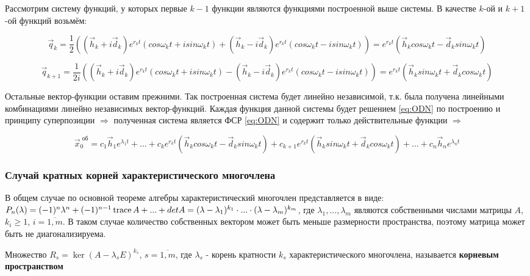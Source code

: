 Рассмотрим систему функций, у которых первые $k-1$ функции являются функциями построенной выше системы. В качестве $k$-ой и $k+1$-ой функций возьмём:

\[
   \vec{q}_k = \frac{1}{2}((\vec{h}_k + i \vec{d}_k) e^{r_k t} (cos \omega_k t + i sin \omega_k t) + (\vec{h}_k - i \vec{d}_k) e^{r_k t} (cos \omega_k t - i sin \omega_k t)) = e^{r_k t} (\vec{h}_k cos \omega_k t - \vec{d}_k sin \omega_k t)
\]

\[
   \vec{q}_{k+1} = \frac{1}{2i}((\vec{h}_k + i \vec{d}_k) e^{r_k t} (cos \omega_k t + i sin \omega_k t) - (\vec{h}_k - i \vec{d}_k) e^{r_k t} (cos \omega_k t - i sin \omega_k t)) = e^{r_k t} (\vec{h}_k sin \omega_k t + \vec{d}_k cos \omega_k t)
\]

Остальные вектор-функции оставим прежними. Так построенная система будет линейно независимой, т.к. была получена линейными комбинациями линейно независимых вектор-функций. Каждая функция данной системы будет решением \eqref{eq:ODN} по построению и принципу суперпозиции $\Rightarrow$ полученная система является ФСР \eqref{eq:ODN} и содержит только действительные функции $\Rightarrow$ 

\begin{equation*}
  \boxed{\vec{x}^{\text{ об}}_0 = c_1 \vec{h}_1 e^{\lambda_1 t} + ...+ c_k e^{r_k t} (\vec{h}_k cos \omega_k t - \vec{d}_k sin \omega_k t) + c_{k+1} e^{r_k t} (\vec{h}_k sin \omega_k t + \vec{d}_k cos \omega_k t) + ... + c_n \vec{h}_n e^{\lambda_n t}}
\end{equation*}

\subsubsection*{Случай кратных корней характеристического многочлена}

В общем случае по основной теореме алгебры характеристический многочлен представляется в виде: 
$P_n (\lambda) = (-1)^n \lambda^n + (-1)^{n-1}\operatorname{trace} A + ... + det A = (\lambda - \lambda_1)^{k_1} \cdot ... \cdot (\lambda - \lambda_m)^{k_m}$, 
где $\lambda_1, ..., \lambda_m$ являются собственными числами матрицы $A$, $k_i \geq 1$, $i = \overline{1, m}$. 
В таком случае количество собственных вектором может быть меньше размерности пространства, поэтому матрица может быть не диагонализируема.

\begin{definition}
  Множество $R_s = \ker (A - \lambda_s E)^{k_s}$, $s = \overline{1, m}$, где $\lambda_s$ - корень кратности $k_s$ характеристического многочлена, называется \textbf{корневым пространством}
\end{definition}

